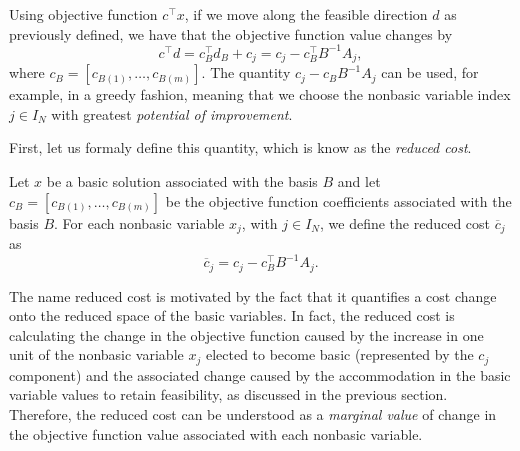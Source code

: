 Using objective function $c^\top x$, if we move along the feasible direction $d$ as previously defined, we have that the objective function value changes by 
%
\begin{equation*}
	c^\top d = c_B^\top d_B + c_j = c_j - c_B^\top B^{-1}A_j,
\end{equation*}
%
where $c_B = [c_{B(1)}, \dots, c_{B(m)}]$. The quantity $c_j - c_BB^{-1}A_j$ can be used, for example, in a greedy fashion, meaning that we choose the nonbasic variable index $j \in I_N$ with greatest \emph{potential of improvement}.

First, let us formaly define this quantity, which is know as the \emph{reduced cost}. 

\begin{definition}
	Let $x$ be a basic solution associated with the basis $B$ and let $c_B = [c_{B(1)}, \dots, c_{B(m)}]$ be the objective function coefficients associated with the basis $B$. For each nonbasic variable $x_j$, with $j \in I_N$, we define the reduced cost $\overline{c}_j$ as
	\begin{equation*}
		\overline{c}_j = c_j - c_B^\top B^{-1}A_j.
	\end{equation*}
\end{definition}

The name reduced cost is motivated by the fact that it quantifies a cost change onto the reduced space of the basic variables. In fact, the reduced cost is calculating the change in the objective function caused by the increase in one unit of the nonbasic variable $x_j$ elected to become basic (represented by the $c_j$ component) and the associated change caused by the accommodation in the basic variable values to retain feasibility, as discussed in the previous section. Therefore, the reduced cost can be understood as a \emph{marginal value} of change in the objective function value associated with each nonbasic variable.

